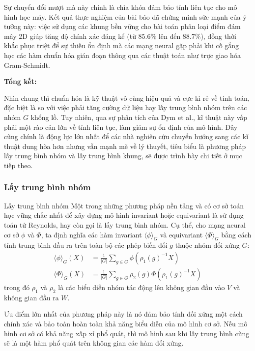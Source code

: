 Sự chuyển đổi mượt mà này chính là chìa khóa đảm bảo tính liên tục cho mô hình học máy. Kết quả thực nghiệm của bài báo đã chứng minh sức mạnh của ý tưởng này: việc sử dụng các khung bền vững cho bài toán phân loại điểm đám mây 2D giúp tăng độ chính xác đáng kể (từ $85.6\%$ lên đến $88.7\%$), đồng thời khắc phục triệt để sự thiếu ổn định mà các mạng neural gặp phải khi cố gắng học các hàm chuẩn hóa gián đoạn thông qua các thuật toán như trực giao hóa Gram-Schmidt.

\textbf{Tổng kết:}

Nhìn chung thì chuẩn hóa là kỹ thuật vô cùng hiệu quả và cực kì rẻ về tính toán, đặc biệt là so với việc phải tăng cường dữ liệu hay lấy trung bình nhóm trên các nhóm $G$ khổng lồ. Tuy nhiên, qua sự phân tích của Dym et al., kĩ thuật này vấp phải một rào cản lớn về tính liên tục, làm giảm sự ổn định của mô hình. Đây cũng chính là động lực lớn nhất để các nhà nghiên cứu chuyển hướng sang các kĩ thuật dung hòa hơn nhưng vẫn mạnh mẽ về lý thuyết, tiêu biểu là phương pháp lấy trung bình nhóm và lấy trung bình khung, sẽ được trình bày chi tiết ở mục tiếp theo.


\subsubsection{Lấy trung bình nhóm}
\label{subsubsec:group-averaging}

\begin{infobox}{Lấy trung bình nhóm}
Một trong những phương pháp nền tảng và có cơ sở toán học vững chắc nhất để xây dựng mô hình invariant hoặc equivariant là sử dụng toán tử Reynolds, hay còn gọi là lấy trung bình nhóm. Cụ thể, cho mạng neural cơ sở $\phi$ và $\Phi$, ta định nghĩa các hàm invariant $\langle \phi \rangle_G$ và equivariant $\langle \Phi \rangle_G$ bằng cách tính trung bình đầu ra trên toàn bộ các phép biến đổi $g$ thuộc nhóm đối xứng $G$:
\begin{align}
    \langle \phi \rangle_G(X) &= \frac{1}{|G|} \sum_{g \in G} \phi(\rho_1(g)^{-1}X) \label{eq:group-avg-inv} \\
    \langle \Phi \rangle_G(X) &= \frac{1}{|G|} \sum_{g \in G} \rho_2(g)\Phi(\rho_1(g)^{-1}X) \label{eq:group-avg-eqv}
\end{align}
trong đó $\rho_1$ và $\rho_2$ là các biểu diễn nhóm tác động lên không gian đầu vào $V$ và không gian đầu ra $W$.
\end{infobox}

Ưu điểm lớn nhất của phương pháp này là nó đảm bảo tính đối xứng một cách chính xác và bảo toàn hoàn toàn khả năng biểu diễn của mô hình cơ sở. Nếu mô hình cơ sở có khả năng xấp xỉ phổ quát, thì mô hình sau khi lấy trung bình cũng sẽ là một hàm phổ quát trên không gian các hàm đối xứng.

